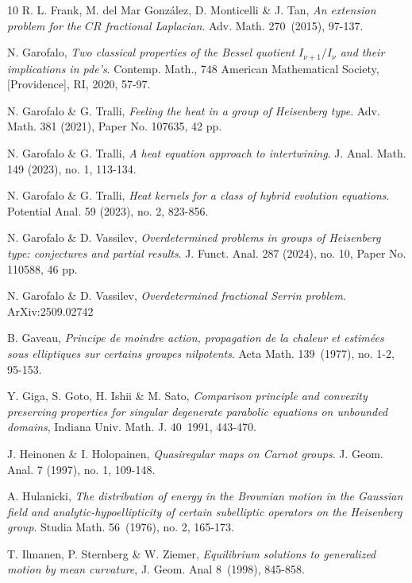 \documentclass[11pt,a4paper]{amsart}
\numberwithin{equation}{section}
\numberwithin{equation}{section}
\begin{document}
\begin{thebibliography}{10}
R. L. Frank, M. del Mar Gonz\'alez, D. Monticelli \& J. Tan, \emph{An extension problem for the $CR$ fractional Laplacian}. Adv. Math. 270~(2015), 97-137. 

N. Garofalo, \emph{Two classical properties of the Bessel quotient $I_{\nu+1}/I_\nu$ and their implications in pde's}.
Contemp. Math., 748
American Mathematical Society, [Providence], RI, 2020, 57-97.


N. Garofalo \& G. Tralli, \emph{Feeling the heat in a group of Heisenberg type}.
Adv. Math. 381 (2021), Paper No. 107635, 42 pp.

N. Garofalo \& G. Tralli, \emph{A heat equation approach to intertwining}.
J. Anal. Math. 149 (2023), no. 1, 113-134.

N. Garofalo \& G. Tralli, \emph{ Heat kernels for a class of hybrid evolution equations}.
Potential Anal. 59 (2023), no. 2, 823-856.

N. Garofalo \& D. Vassilev, \emph{Overdetermined problems in groups of Heisenberg type: conjectures and partial results}.
J. Funct. Anal. 287 (2024), no. 10, Paper No. 110588, 46 pp.

N. Garofalo \& D. Vassilev, \emph{Overdetermined fractional Serrin problem}. ArXiv:2509.02742


B. Gaveau, \emph{Principe de moindre action, propagation de la chaleur et estim\'ees sous elliptiques sur certains groupes nilpotents}. Acta Math. 139~(1977), no. 1-2, 95-153. 

Y. Giga, S. Goto,  H. Ishii \& M. Sato, \emph{Comparison principle and  convexity preserving properties for singular degenerate parabolic equations on unbounded domains}, Indiana Univ. Math. J. 40~1991,  443-470.

J. Heinonen \& I. Holopainen, \emph{Quasiregular maps on Carnot groups}. J. Geom. Anal. 7 (1997), no. 1, 109-148.


A. Hulanicki, \emph{The distribution of energy in the Brownian motion in the Gaussian field and analytic-hypoellipticity of certain subelliptic operators on the Heisenberg group}. Studia Math. 56~(1976), no. 2, 165-173. 

T. Ilmanen, P. Sternberg \& W. Ziemer, \emph{Equilibrium solutions to generalized motion by mean curvature},  J. Geom. Anal 8~(1998), 845-858.






\end{thebibliography}
\end{document}
